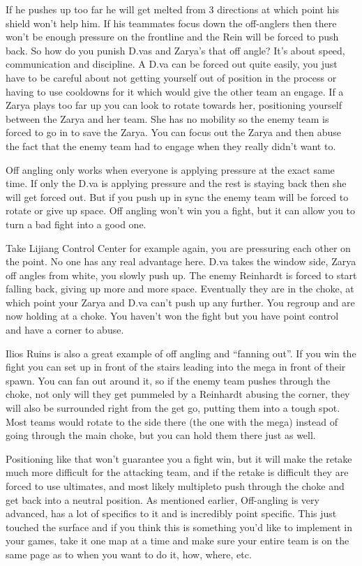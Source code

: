 If he pushes up too far he will get melted from 3 directions at which point his shield won’t help him. If his teammates focus down the off-anglers then there won’t be enough pressure on the frontline and the Rein will be forced to push back. So how do you punish D.vas and Zarya's that off angle? It’s about speed, communication and discipline. A D.va can be forced out quite easily, you just have to be careful about not getting yourself out of position in the process or having to use cooldowns for it which would give the other team an engage. If a Zarya plays too far up you can look to rotate towards her, positioning yourself between the Zarya and her team. She has no mobility so the enemy team is forced to go in to save the Zarya. You can focus out the Zarya and then abuse the fact that the enemy team had to engage when they really didn’t want to.


Off angling only works when everyone is applying pressure at the exact same time. If only the D.va is applying pressure and the rest is staying back then she will get forced out. But if you push up in sync the enemy team will be forced to rotate or give up space. Off angling won’t win you a fight, but it can allow you to turn a bad fight into a good one.

Take Lijiang Control Center for example again, you are pressuring each other on the point. No one has any real advantage here. D.va takes the window side, Zarya off angles from white, you slowly push up. The enemy Reinhardt is forced to start falling back, giving up more and more space. Eventually they are in the choke, at which point your Zarya and D.va can’t push up any further. You regroup and are now holding at a choke. You haven’t won the fight but you have point control and have a corner to abuse.

Ilios Ruins is also a great example of off angling and “fanning out”. If you win the fight you can set up in front of the stairs leading into the mega in front of their spawn. You can fan out around it, so if the enemy team pushes through the choke, not only will they get pummeled by a Reinhardt abusing the corner, they will also be surrounded right from the get go, putting them into a tough spot. Most teams would rotate to the side there (the one with the mega) instead of going through the main choke, but you can hold them there just as well. 

Positioning like that won’t guarantee you a fight win, but it will make the retake much more difficult for the attacking team, and if the retake is difficult they are forced to use ultimates, and most likely multipleto push through the choke and get back into a neutral position.  As mentioned earlier, Off-angling is very advanced, has a lot of specifics to it and is incredibly point specific. This just touched the surface and if you think this is something you’d like to implement in your games, take it one map at a time and make sure your entire team is on the same page as to when you want to do it, how, where, etc.

